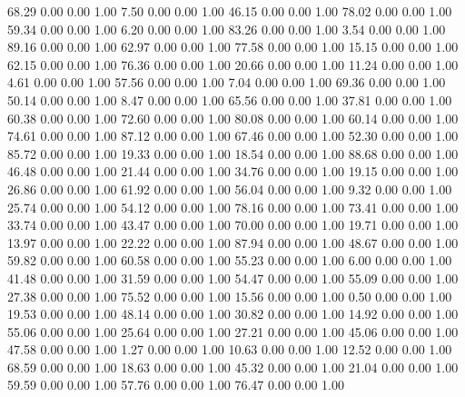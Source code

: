    68.29   0.00   0.00   1.00
    7.50   0.00   0.00   1.00
   46.15   0.00   0.00   1.00
   78.02   0.00   0.00   1.00
   59.34   0.00   0.00   1.00
    6.20   0.00   0.00   1.00
   83.26   0.00   0.00   1.00
    3.54   0.00   0.00   1.00
   89.16   0.00   0.00   1.00
   62.97   0.00   0.00   1.00
   77.58   0.00   0.00   1.00
   15.15   0.00   0.00   1.00
   62.15   0.00   0.00   1.00
   76.36   0.00   0.00   1.00
   20.66   0.00   0.00   1.00
   11.24   0.00   0.00   1.00
    4.61   0.00   0.00   1.00
   57.56   0.00   0.00   1.00
    7.04   0.00   0.00   1.00
   69.36   0.00   0.00   1.00
   50.14   0.00   0.00   1.00
    8.47   0.00   0.00   1.00
   65.56   0.00   0.00   1.00
   37.81   0.00   0.00   1.00
   60.38   0.00   0.00   1.00
   72.60   0.00   0.00   1.00
   80.08   0.00   0.00   1.00
   60.14   0.00   0.00   1.00
   74.61   0.00   0.00   1.00
   87.12   0.00   0.00   1.00
   67.46   0.00   0.00   1.00
   52.30   0.00   0.00   1.00
   85.72   0.00   0.00   1.00
   19.33   0.00   0.00   1.00
   18.54   0.00   0.00   1.00
   88.68   0.00   0.00   1.00
   46.48   0.00   0.00   1.00
   21.44   0.00   0.00   1.00
   34.76   0.00   0.00   1.00
   19.15   0.00   0.00   1.00
   26.86   0.00   0.00   1.00
   61.92   0.00   0.00   1.00
   56.04   0.00   0.00   1.00
    9.32   0.00   0.00   1.00
   25.74   0.00   0.00   1.00
   54.12   0.00   0.00   1.00
   78.16   0.00   0.00   1.00
   73.41   0.00   0.00   1.00
   33.74   0.00   0.00   1.00
   43.47   0.00   0.00   1.00
   70.00   0.00   0.00   1.00
   19.71   0.00   0.00   1.00
   13.97   0.00   0.00   1.00
   22.22   0.00   0.00   1.00
   87.94   0.00   0.00   1.00
   48.67   0.00   0.00   1.00
   59.82   0.00   0.00   1.00
   60.58   0.00   0.00   1.00
   55.23   0.00   0.00   1.00
    6.00   0.00   0.00   1.00
   41.48   0.00   0.00   1.00
   31.59   0.00   0.00   1.00
   54.47   0.00   0.00   1.00
   55.09   0.00   0.00   1.00
   27.38   0.00   0.00   1.00
   75.52   0.00   0.00   1.00
   15.56   0.00   0.00   1.00
    0.50   0.00   0.00   1.00
   19.53   0.00   0.00   1.00
   48.14   0.00   0.00   1.00
   30.82   0.00   0.00   1.00
   14.92   0.00   0.00   1.00
   55.06   0.00   0.00   1.00
   25.64   0.00   0.00   1.00
   27.21   0.00   0.00   1.00
   45.06   0.00   0.00   1.00
   47.58   0.00   0.00   1.00
    1.27   0.00   0.00   1.00
   10.63   0.00   0.00   1.00
   12.52   0.00   0.00   1.00
   68.59   0.00   0.00   1.00
   18.63   0.00   0.00   1.00
   45.32   0.00   0.00   1.00
   21.04   0.00   0.00   1.00
   59.59   0.00   0.00   1.00
   57.76   0.00   0.00   1.00
   76.47   0.00   0.00   1.00
